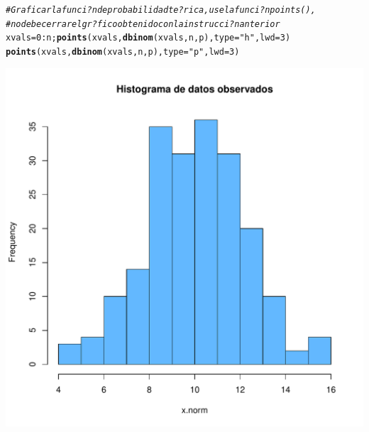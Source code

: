 \documentclass[10pt,a4paper]{article}\usepackage[]{graphicx}\usepackage[]{color}
\makeatletter
\def\maxwidth{ %
  \ifdim\Gin@nat@width>\linewidth
    \linewidth
  \else
    \Gin@nat@width
  \fi
}
\newcommand{\hlnum}[1]{\textcolor[rgb]{0.686,0.059,0.569}{#1}}%
\newcommand{\hlstr}[1]{\textcolor[rgb]{0.192,0.494,0.8}{#1}}%
\newcommand{\hlcom}[1]{\textcolor[rgb]{0.678,0.584,0.686}{\textit{#1}}}%
\newcommand{\hlopt}[1]{\textcolor[rgb]{0,0,0}{#1}}%
\newcommand{\hlstd}[1]{\textcolor[rgb]{0.345,0.345,0.345}{#1}}%
\newcommand{\hlkwb}[1]{\textcolor[rgb]{0.69,0.353,0.396}{#1}}%
\newcommand{\hlkwc}[1]{\textcolor[rgb]{0.333,0.667,0.333}{#1}}%
\newcommand{\hlkwd}[1]{\textcolor[rgb]{0.737,0.353,0.396}{\textbf{#1}}}%
\newenvironment{kframe}{%
 \def\at@end@of@kframe{}%
 \ifinner\ifhmode%
  \def\at@end@of@kframe{\end{minipage}}%
  \begin{minipage}{\columnwidth}%
 \fi\fi%
 \def\FrameCommand##1{\hskip\@totalleftmargin \hskip-\fboxsep
 \colorbox{shadecolor}{##1}\hskip-\fboxsep
     \hskip-\linewidth \hskip-\@totalleftmargin \hskip\columnwidth}%
 \MakeFramed {\advance\hsize-\width
   \@totalleftmargin\z@ \linewidth\hsize
   \@setminipage}}%
 {\par\unskip\endMakeFramed%
 \at@end@of@kframe}
\newenvironment{knitrout}{}{} %
\makeatother
\begin{document}
\begin{knitrout}
\begin{kframe}
\begin{alltt}
\hlcom{# Graficar la funci?n de probabilidad te?rica, use la funci?n points(), }
\hlcom{#no debe cerrar el gr?fico obtenido con la instrucci?n anterior }
\hlstd{xvals}\hlkwb{=}\hlnum{0}\hlopt{:}\hlstd{n;} \hlkwd{points}\hlstd{(xvals,} \hlkwd{dbinom}\hlstd{(xvals, n, p),} \hlkwc{type}\hlstd{=}\hlstr{"h"}\hlstd{,} \hlkwc{lwd}\hlstd{=}\hlnum{3}\hlstd{)}
\hlkwd{points}\hlstd{(xvals,} \hlkwd{dbinom}\hlstd{(xvals, n, p),} \hlkwc{type}\hlstd{=}\hlstr{"p"}\hlstd{,} \hlkwc{lwd}\hlstd{=}\hlnum{3}\hlstd{)}
\end{alltt}
\end{kframe}
\includegraphics[width=\maxwidth]{figure/unnamed-chunk-5-1} 

\end{knitrout}
\end{document}
